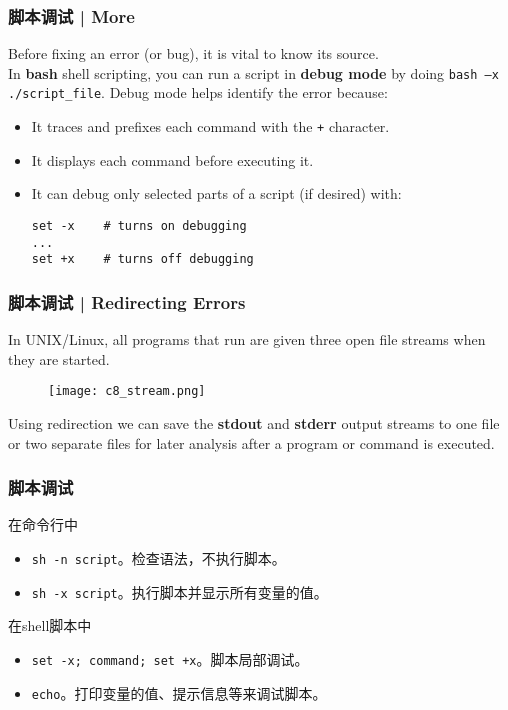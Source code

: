 \begin{frame}[fragile]
  \frametitle{脚本调试 | More}
  Before fixing an error (or bug), it is vital to know its source.\\
  \vspace{0.3cm}
  In \textbf{bash} shell scripting, you can run a script in \textbf{debug mode} by doing \verb|bash –x ./script_file|. Debug mode helps identify the error because:
  \begin{itemize}
    \item It traces and prefixes each command with the \verb|+| character.
    \item It displays each command before executing it.
    \item It can debug only selected parts of a script (if desired) with:\\
\begin{lstlisting}
set -x    # turns on debugging
...
set +x    # turns off debugging
\end{lstlisting}
  \end{itemize}
\end{frame}

\begin{frame}
  \frametitle{脚本调试 | Redirecting Errors}
  In UNIX/Linux, all programs that run are given three open file streams when they are started.
  \vspace{-0.3cm}
  \begin{figure}
    \centering
    \texttt{[image: c8\_stream.png]}
  \end{figure}
  \vspace{-0.3cm}
  Using redirection we can save the \textbf{stdout} and \textbf{stderr} output streams to one file or two separate files for later analysis after a program or command is executed.
\end{frame}


\begin{frame}[fragile]
  \frametitle{\alert{脚本调试}}
  \begin{block}{在命令行中}
  \begin{itemize}
    \item \verb|sh -n script|。检查语法，不执行脚本。
    \item \verb|sh -x script|。执行脚本并显示所有变量的值。
  \end{itemize}
\end{block}
\pause
  \begin{block}{在shell脚本中}
  \begin{itemize}
    \item \verb|set -x; command; set +x|。脚本局部调试。
    \item \verb|echo|。打印变量的值、提示信息等来调试脚本。
  \end{itemize}
\end{block}
\end{frame}


